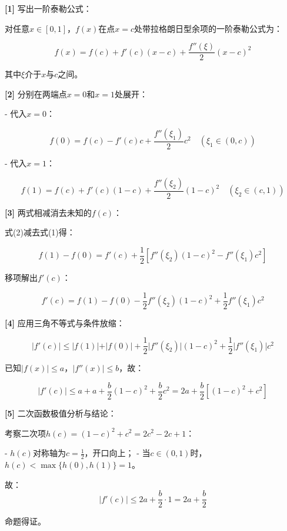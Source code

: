 \documentclass[11pt,a4paper,UTF8]{ctexart}
\begin{document}
\begin{solbox}[分步推导与答题规范]
\textbf{[1]} 写出一阶泰勒公式：

对任意$x \in [0, 1]$，$f(x)$在点$x = c$处带拉格朗日型余项的一阶泰勒公式为：


\begin{equation*}
f(x) = f(c) + f'(c)(x - c) + \frac{f''(\xi)}{2}(x - c)^2
\end{equation*}


其中$\xi$介于$x$与$c$之间。

\textbf{[2]} 分别在两端点$x = 0$和$x = 1$处展开：

- 代入$x = 0$：

 
\begin{equation*}
f(0) = f(c) - f'(c)c + \frac{f''(\xi_1)}{2}c^2 \quad (\xi_1 \in (0, c)) \tag{1}
\end{equation*}


- 代入$x = 1$：

 
\begin{equation*}
f(1) = f(c) + f'(c)(1 - c) + \frac{f''(\xi_2)}{2}(1 - c)^2 \quad (\xi_2 \in (c, 1)) \tag{2}
\end{equation*}


\textbf{[3]} 两式相减消去未知的$f(c)$：

式(2)减去式(1)得：


\begin{equation*}
f(1) - f(0) = f'(c) + \frac{1}{2}\left[ f''(\xi_2)(1 - c)^2 - f''(\xi_1)c^2 \right]
\end{equation*}


移项解出$f'(c)$：


\begin{equation*}
f'(c) = f(1) - f(0) - \frac{1}{2}f''(\xi_2)(1 - c)^2 + \frac{1}{2}f''(\xi_1)c^2
\end{equation*}


\textbf{[4]} 应用三角不等式与条件放缩：


\begin{equation*}
\vert{}f'(c)\vert{} \le \vert{}f(1)\vert{} + \vert{}f(0)\vert{} + \frac{1}{2}\vert{}f''(\xi_2)\vert{}(1 - c)^2 + \frac{1}{2}\vert{}f''(\xi_1)\vert{}c^2
\end{equation*}


已知$\vert{}f(x)\vert{} \le a$，$\vert{}f''(x)\vert{} \le b$，故：


\begin{equation*}
\vert{}f'(c)\vert{} \le a + a + \frac{b}{2}(1 - c)^2 + \frac{b}{2}c^2 = 2a + \frac{b}{2}\left[(1 - c)^2 + c^2\right]
\end{equation*}


\textbf{[5]} 二次函数极值分析与结论：

考察二次项$h(c) = (1 - c)^2 + c^2 = 2c^2 - 2c + 1$：

- $h(c)$对称轴为$c = \frac{1}{2}$，开口向上；
- 当$c \in (0, 1)$时，$h(c) < \max\{h(0), h(1)\} = 1$。

故：
\begin{equation*}
\vert{}f'(c)\vert{} \le 2a + \frac{b}{2} \cdot 1 = 2a + \frac{b}{2}
\end{equation*}


命题得证。
\end{solbox}
\end{document}
